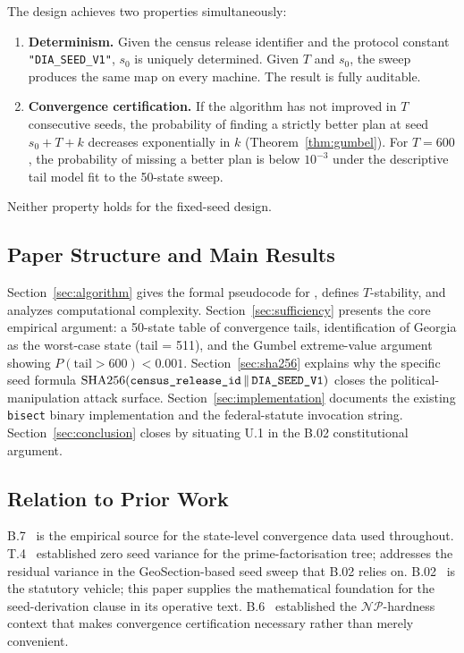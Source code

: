 The design achieves two properties simultaneously:
\begin{enumerate}
\item \textbf{Determinism.} Given the census release identifier and the
      protocol constant \texttt{"DIA\_SEED\_V1"}, $s_0$ is uniquely determined.
      Given $T$ and $s_0$, the sweep produces the same map on every machine.
      The result is fully auditable.
\item \textbf{Convergence certification.} If the algorithm has not improved in $T$ consecutive
      seeds, the probability of finding a strictly better plan at seed
      $s_0 + T + k$ decreases exponentially in $k$ (Theorem~\ref{thm:gumbel}).
      For $T = 600$, the probability of missing a better plan is below
      $10^{-3}$ under the descriptive tail model fit to the 50-state sweep.
\end{enumerate}

Neither property holds for the fixed-seed design.

\subsection{Paper Structure and Main Results}

Section~\ref{sec:algorithm} gives the formal pseudocode for \cs{},
defines $T$-stability, and analyzes computational complexity.
Section~\ref{sec:sufficiency} presents the core empirical argument: a
50-state table of convergence tails, identification of Georgia as the
worst-case state (tail = 511), and the Gumbel extreme-value argument showing
$P(\text{tail} > 600) < 0.001$.
Section~\ref{sec:sha256} explains why the specific seed formula
$\operatorname{SHA256}\!\left(\text{\ttfamily census\_release\_id}\,\|\,\text{\ttfamily DIA\_SEED\_V1}\right)$
closes the political-manipulation attack surface.
Section~\ref{sec:implementation} documents the existing \texttt{bisect}
binary implementation and the federal-statute invocation string.
Section~\ref{sec:conclusion} closes by situating U.1 in the B.02
constitutional argument.

\subsection{Relation to Prior Work}

B.7~\citep{b7paper} is the empirical source for the state-level convergence
data used throughout.
T.4~\citep{b11paper} established zero seed variance for the \ar{}
prime-factorisation tree; \cs{} addresses the residual variance in the
GeoSection-based seed sweep that B.02 relies on.
B.02~\citep{b02paper} is the statutory vehicle; this paper supplies the
mathematical foundation for the seed-derivation clause in its operative text.
B.6~\citep{b6paper} established the $\mathcal{NP}$-hardness context that
makes convergence certification necessary rather than merely convenient.
